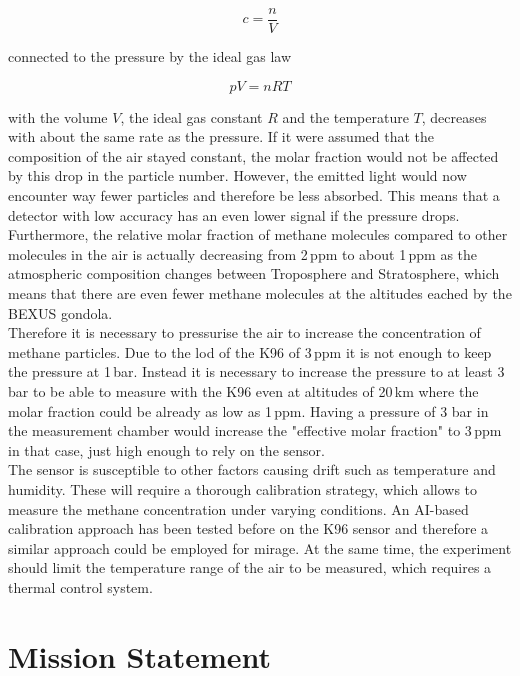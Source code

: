 \documentclass[
  a4paper,
  11pt,
  openany,
  parskip,
  toc=totoc,
  listof=totoc,
  bibliography=totoc
]{scrreprt}
\begin{document}
\begin{equation}
c = \frac{n}{V}
\end{equation}

connected to the pressure by the ideal gas law

\begin{equation}
pV = nRT
\end{equation}

with the volume $V$, the ideal gas constant $R$ and the temperature $T$, decreases with about the same rate as the pressure. If it were assumed that the composition of the air stayed constant, the molar fraction would not be affected by this drop in the particle number. However, the emitted light would now encounter way fewer particles and therefore be less absorbed. This means that a detector with low accuracy has an even lower signal if the pressure drops. Furthermore, the relative molar fraction of methane molecules compared to other molecules in the air is actually decreasing from 2\,ppm to about 1\,ppm as the atmospheric composition changes between Troposphere and Stratosphere, which means that there are even fewer methane molecules at the altitudes eached by the BEXUS gondola.\\
Therefore it is necessary to pressurise the air to increase the concentration of methane particles. Due to the \gls{lod} of the K96 of 3\,ppm it is not enough to keep the pressure at 1\,bar. Instead it is necessary to increase the pressure to at least 3\,bar to be able to measure with the K96 even at altitudes of 20\,km where the molar fraction could be already as low as 1\,ppm. Having a pressure of 3 bar in the measurement chamber would increase the "effective molar fraction" to 3\,ppm in that case, just high enough to rely on the sensor. \\
The sensor is susceptible to other factors causing drift such as temperature and humidity. These will require a thorough calibration strategy, which allows to measure the methane concentration under varying conditions. An AI-based calibration approach has been tested before on the K96 sensor\cite{gia_accurate_2025} and therefore a similar approach could be employed for \gls{mirage}. At the same time, the experiment should limit the temperature range of the air to be measured, which requires a thermal control system.\\



\section{Mission Statement}
\end{document}
